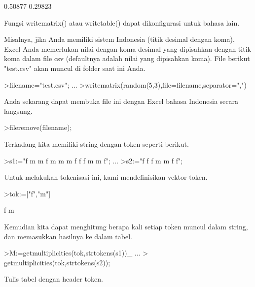 \documentclass[a4paper,10pt]{article}
\begin{document}
\begin{eulernotebook}
\begin{eulercomment}
\begin{eulercomment}
\begin{eulercomment}
\begin{eulercomment}
\begin{eulercomment}
\begin{eulercomment}
\begin{eulercomment}
\begin{eulercomment}
\begin{eulercomment}
\begin{eulercomment}
\begin{eulercomment}
\begin{eulercomment}
\begin{eulercomment}
\begin{eulercomment}
\begin{euleroutput}
  0.50877
  0.29823
\end{euleroutput}
\begin{eulercomment}
Fungsi writematrix() atau writetable() dapat dikonfigurasi untuk
bahasa lain.

Misalnya, jika Anda memiliki sistem Indonesia (titik desimal dengan
koma), Excel Anda memerlukan nilai dengan koma desimal yang dipisahkan
dengan titik koma dalam file csv (defaultnya adalah nilai yang
dipisahkan koma). File berikut "test.csv" akan muncul di folder saat
ini Anda.
\end{eulercomment}
\begin{eulerprompt}
>filename="test.csv"; ...
>writematrix(random(5,3),file=filename,separator=",")
\end{eulerprompt}
\begin{eulercomment}
Anda sekarang dapat membuka file ini dengan Excel bahasa Indonesia
secara langsung.
\end{eulercomment}
\begin{eulerprompt}
>fileremove(filename);
\end{eulerprompt}
\begin{eulercomment}
Terkadang kita memiliki string dengan token seperti berikut.
\end{eulercomment}
\begin{eulerprompt}
>s1:="f m m f m m m f f f m m f";  ...
>s2:="f f f m m f f";
\end{eulerprompt}
\begin{eulercomment}
Untuk melakukan tokenisasi ini, kami mendefinisikan vektor token.
\end{eulercomment}
\begin{eulerprompt}
>tok:=["f","m"]
\end{eulerprompt}
\begin{euleroutput}
  f
  m
\end{euleroutput}
\begin{eulercomment}
Kemudian kita dapat menghitung berapa kali setiap token muncul dalam
string, dan memasukkan hasilnya ke dalam tabel.
\end{eulercomment}
\begin{eulerprompt}
>M:=getmultiplicities(tok,strtokens(s1))_ ...
>  getmultiplicities(tok,strtokens(s2));
\end{eulerprompt}
\begin{eulercomment}
Tulis tabel dengan header token.
\end{eulercomment}
\begin{eulerprompt}

\end{eulerprompt}
\end{eulercomment}
\end{eulercomment}
\end{eulercomment}
\end{eulercomment}
\end{eulercomment}
\end{eulercomment}
\end{eulercomment}
\end{eulercomment}
\end{eulercomment}
\end{eulercomment}
\end{eulercomment}
\end{eulercomment}
\end{eulercomment}
\end{eulercomment}
\end{eulernotebook}
\end{document}
